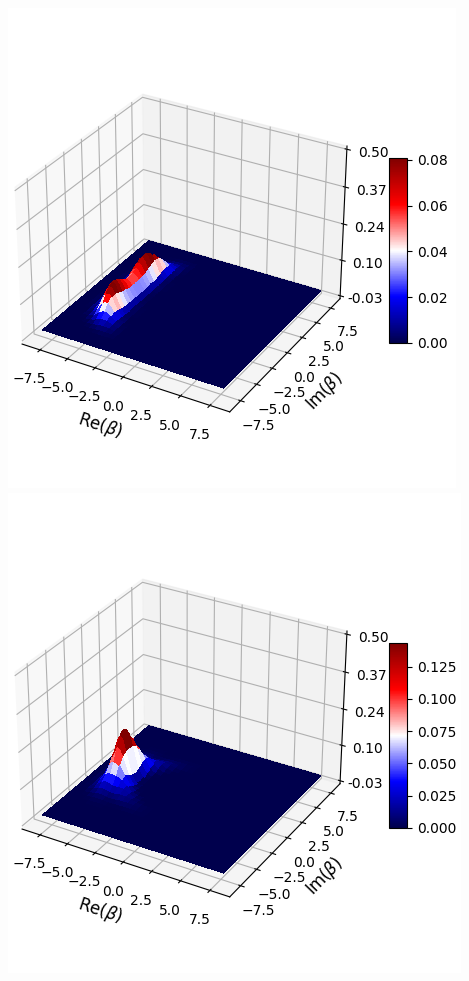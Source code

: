 \documentclass[11pt, oneside]{book}
\theoremstyle{break}
\theoremstyle{break}
\begin{document}
\begin{center}
\includegraphics[scale=0.4]{542HW6/Q(30)}
\includegraphics[scale=0.4]{542HW6/Q(35)}

\end{center}
\end{document}
